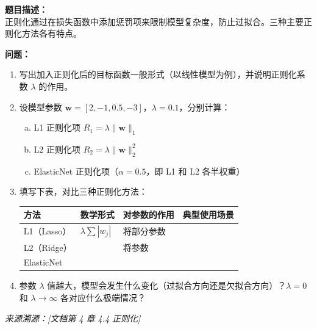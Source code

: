 \documentclass[a4paper,11pt]{ctexart}
\begin{document}
\begin{problembox}
    \textbf{题目描述：}\\
    正则化通过在损失函数中添加惩罚项来限制模型复杂度，防止过拟合。三种主要正则化方法各有特点。

    \vspace{0.2cm}
    \textbf{问题：}
    \begin{enumerate}[(1)]
        \item 写出加入正则化后的目标函数一般形式（以线性模型为例），并说明正则化系数 $\lambda$ 的作用。

        \item 设模型参数 $\mathbf{w} = [2, -1, 0.5, -3]$，$\lambda = 0.1$，分别计算：
        \begin{enumerate}[a.]
            \item L1 正则化项 $R_1 = \lambda\|\mathbf{w}\|_1$
            \item L2 正则化项 $R_2 = \lambda\|\mathbf{w}\|_2^2$
            \item ElasticNet 正则化项（$\alpha=0.5$，即 L1 和 L2 各半权重）
        \end{enumerate}

        \item 填写下表，对比三种正则化方法：
        \begin{center}
        \begin{tabular}{p{2.5cm} p{3.5cm} p{3.5cm} p{3cm}}
            \toprule
            方法 & 数学形式 & 对参数的作用 & 典型使用场景 \\
            \midrule
            L1（Lasso） & $\lambda\sum|w_j|$ & 将部分参数\underline{\hspace{1.5cm}} & \underline{\hspace{2.5cm}} \\[1.2em]
            L2（Ridge） & \underline{\hspace{3cm}} & 将参数\underline{\hspace{2cm}} & \underline{\hspace{2.5cm}} \\[1.2em]
            ElasticNet & \underline{\hspace{3cm}} & \underline{\hspace{3cm}} & \underline{\hspace{2.5cm}} \\
            \bottomrule
        \end{tabular}
        \end{center}

        \item 参数 $\lambda$ 值越大，模型会发生什么变化（过拟合方向还是欠拟合方向）？$\lambda=0$ 和 $\lambda\to\infty$ 各对应什么极端情况？
    \end{enumerate}
    {\color{gray}\small\textit{来源溯源：[文档第 4 章 4.4 正则化]}}
\end{problembox}
\end{document}

